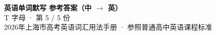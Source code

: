 \documentclass[10pt,a4paper]{article}
\begin{document}
\pagestyle{plain}

\begin{center}
{\LARGE\bfseries 英语单词默写 \quad 参考答案（中 $\to$ 英）}\\[0.22em]
{\large T 字母 · 第 5 / 5 份}\\[0.18em]
{\small 2026年上海市高考英语词汇用法手册 · 参照普通高中英语课程标准}
\end{center}

\vspace{0.2em}
\noindent{\color{rulegray}\rule{\textwidth}{0.8pt}}

\vspace{0.35em}

\vspace{0.25em}
\renewcommand{\arraystretch}{1.32}
\end{document}
